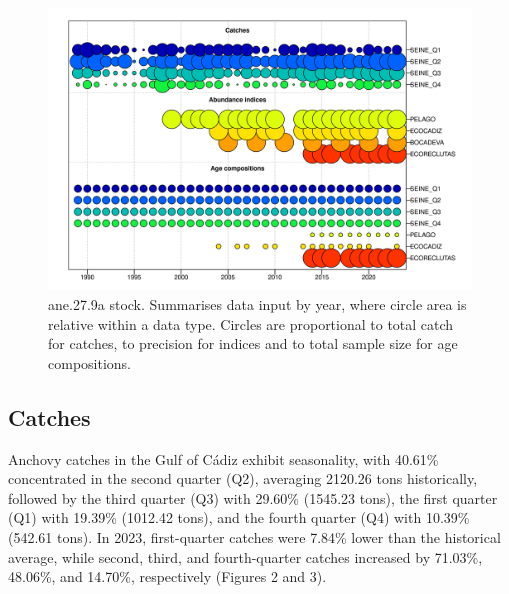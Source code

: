 \documentclass[
]{article}
\begin{document}
\begin{figure}[H]

{\centering \includegraphics[width=0.95\linewidth]{report/run/S1.0_4FLEETS/fig_input_data} 

}

\caption{ane.27.9a stock. Summarises data input by year, where circle area is relative within a data type. Circles are proportional to total catch for catches, to precision for indices and to total sample size for age compositions.}\label{fig:unnamed-chunk-2}
\end{figure}

\hypertarget{catches}{%
\subsection{Catches}\label{catches}}

Anchovy catches in the Gulf of Cádiz exhibit seasonality, with 40.61\%
concentrated in the second quarter (Q2), averaging 2120.26 tons
historically, followed by the third quarter (Q3) with 29.60\% (1545.23
tons), the first quarter (Q1) with 19.39\% (1012.42 tons), and the
fourth quarter (Q4) with 10.39\% (542.61 tons). In 2023, first-quarter
catches were 7.84\% lower than the historical average, while second,
third, and fourth-quarter catches increased by 71.03\%, 48.06\%, and
14.70\%, respectively (Figures 2 and 3).
\end{document}
